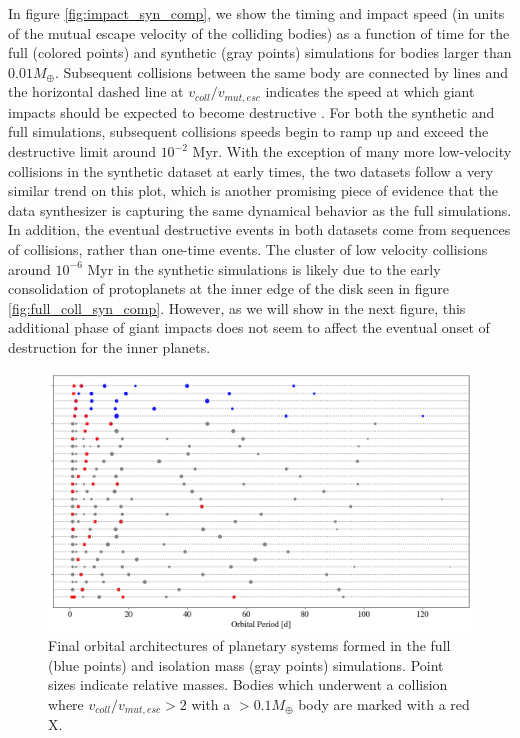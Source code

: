 In figure \ref{fig:impact_syn_comp}, we show the timing and impact speed (in units of the mutual escape velocity of the colliding bodies) as a function of time for the full (colored points) and synthetic (gray points) simulations for bodies larger than $0.01 M_{\oplus}$. Subsequent collisions between the same body are connected by lines and the horizontal dashed line at $v_{coll}/v_{mut, esc}$ indicates the speed at which giant impacts should be expected to become destructive \cite{marcus09}. For both the synthetic and full simulations, subsequent collisions speeds begin to ramp up and exceed the destructive limit around $10^{-2}$ Myr. With the exception of many more low-velocity collisions in the synthetic dataset at early times, the two datasets follow a very similar trend on this plot, which is another promising piece of evidence that the data synthesizer is capturing the same dynamical behavior as the full simulations. In addition, the eventual destructive events in both datasets come from sequences of collisions, rather than one-time events. The cluster of low velocity collisions around $10^{-6}$ Myr in the synthetic simulations is likely due to the early consolidation of protoplanets at the inner edge of the disk seen in figure \ref{fig:full_coll_syn_comp}. However, as we will show in the next figure, this additional phase of giant impacts does not seem to affect the eventual onset of destruction for the inner planets.

\begin{figure}
\begin{center}
    \includegraphics[width=\textwidth]{figures/stip/architectures_syn_comp.png}
    \caption{Final orbital architectures of planetary systems formed in the full (blue points) and isolation mass (gray points) simulations. Point sizes indicate relative masses. Bodies which underwent a collision where $v_{coll}/v_{mut,esc} > 2$ with a $> 0.1 M_{\oplus}$ body are marked with a red X.\label{fig:architectures_syn_comp}}
\end{center}
\end{figure}

